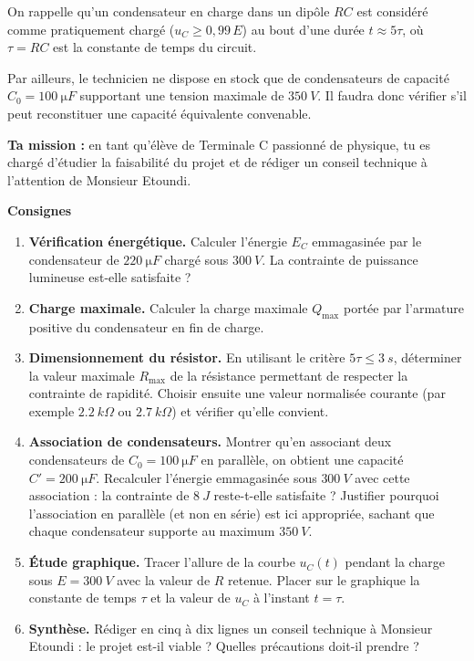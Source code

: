 \documentclass[11pt]{article}
\begin{document}
On rappelle qu'un condensateur en charge dans un dipôle $RC$ est considéré comme pratiquement chargé ($u_C \geq 0{,}99\,E$) au bout d'une durée $t \approx 5\tau$, où $\tau = RC$ est la constante de temps du circuit.

Par ailleurs, le technicien ne dispose en stock que de condensateurs de capacité $C_0 = \SI{100}{\micro F}$ supportant une tension maximale de $\SI{350}{V}$. Il faudra donc vérifier s'il peut reconstituer une capacité équivalente convenable.

\textbf{Ta mission :} en tant qu'élève de Terminale C passionné de physique, tu es chargé d'étudier la faisabilité du projet et de rédiger un conseil technique à l'attention de Monsieur Etoundi.

\textbf{Consignes}\par

\begin{enumerate}
\item \textbf{Vérification énergétique.} Calculer l'énergie $E_C$ emmagasinée par le condensateur de $\SI{220}{\micro F}$ chargé sous $\SI{300}{V}$. La contrainte de puissance lumineuse est-elle satisfaite ?
\item \textbf{Charge maximale.} Calculer la charge maximale $Q_{\max}$ portée par l'armature positive du condensateur en fin de charge.
\item \textbf{Dimensionnement du résistor.} En utilisant le critère $5\tau \leq \SI{3}{s}$, déterminer la valeur maximale $R_{\max}$ de la résistance permettant de respecter la contrainte de rapidité. Choisir ensuite une valeur normalisée courante (par exemple $\SI{2,2}{k\Omega}$ ou $\SI{2,7}{k\Omega}$) et vérifier qu'elle convient.
\item \textbf{Association de condensateurs.} Montrer qu'en associant deux condensateurs de $C_0 = \SI{100}{\micro F}$ en parallèle, on obtient une capacité $C' = \SI{200}{\micro F}$. Recalculer l'énergie emmagasinée sous $\SI{300}{V}$ avec cette association : la contrainte de $\SI{8}{J}$ reste-t-elle satisfaite ? Justifier pourquoi l'association en parallèle (et non en série) est ici appropriée, sachant que chaque condensateur supporte au maximum $\SI{350}{V}$.
\item \textbf{Étude graphique.} Tracer l'allure de la courbe $u_C(t)$ pendant la charge sous $E = \SI{300}{V}$ avec la valeur de $R$ retenue. Placer sur le graphique la constante de temps $\tau$ et la valeur de $u_C$ à l'instant $t = \tau$.
\item \textbf{Synthèse.} Rédiger en cinq à dix lignes un conseil technique à Monsieur Etoundi : le projet est-il viable ? Quelles précautions doit-il prendre ?
\end{enumerate}
\end{document}
